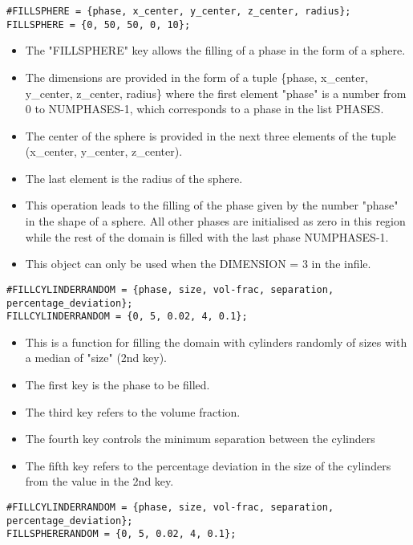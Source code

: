 \documentclass[a4paper,10pt]{article}
\begin{document}
\begin{lstlisting}
#FILLSPHERE = {phase, x_center, y_center, z_center, radius};
FILLSPHERE = {0, 50, 50, 0, 10};
\end{lstlisting}

\begin{itemize}
 \item The "FILLSPHERE" key allows the filling of a phase in the form of a sphere. 
 \item The dimensions are provided in the form of a tuple \{phase, x\_center, y\_center, z\_center, radius\}
 where the first element "phase" is a number from 0 to NUMPHASES-1, which corresponds to a phase in the list PHASES.
 \item The center of the sphere is provided in the next three elements of the tuple (x\_center, y\_center, z\_center).
 \item The last element is the radius of the sphere.
 \item This operation leads to the filling of the phase given by the number "phase" in the shape of a sphere. All other phases are initialised as zero in this region while the 
 rest of the domain is filled with the last phase NUMPHASES-1.
 \item This object can only be used when the DIMENSION = 3 in the infile.
\end{itemize}

\begin{lstlisting}
#FILLCYLINDERRANDOM = {phase, size, vol-frac, separation, percentage_deviation};
FILLCYLINDERRANDOM = {0, 5, 0.02, 4, 0.1};
\end{lstlisting}

\begin{itemize}
 \item This is a function for filling the domain with cylinders randomly of sizes with a median of "size" (2nd key).
 \item The first key is the phase to be filled.
 \item The third key refers to the volume fraction.
 \item The fourth key controls the minimum separation between the cylinders
 \item The fifth key refers to the percentage deviation in the size of the cylinders from the value in the 2nd key.
\end{itemize}

\begin{lstlisting}
#FILLCYLINDERRANDOM = {phase, size, vol-frac, separation, percentage_deviation};
FILLSPHERERANDOM = {0, 5, 0.02, 4, 0.1};
\end{lstlisting}
\end{document}
